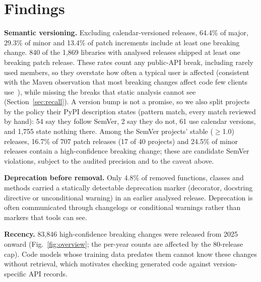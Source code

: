 \documentclass[10pt,twocolumn,letterpaper]{article}
\begin{document}
\section{Findings}\label{sec:findings}

\textbf{Semantic versioning.} Excluding calendar-versioned releases, 64.4\% of major, 29.3\% of minor and 13.4\% of patch increments include at least one
breaking change. 840 of the 1,869 libraries with analysed releases shipped at least one
breaking patch release. These rates count any public-API break, including rarely used members, so they overstate how often a typical user
is affected (consistent with the Maven observation that most breaking changes affect code few clients
use~\cite{ochoa2022}), while missing the breaks that static analysis cannot see (Section~\ref{sec:recall}). A version bump is not a promise, so we also split projects by the policy their PyPI
description states (pattern match, every match reviewed by hand): 54 say they follow SemVer,
2 say they do not, 61 use calendar versions, and 1,755 state nothing there. Among the
SemVer projects' stable ($\geq$1.0) releases, 16.7\% of 707 patch releases
(17 of 40 projects) and 24.5\% of minor releases contain a high-confidence
breaking change; these are candidate SemVer violations, subject to the audited precision and to the caveat above.

\textbf{Deprecation before removal.} Only 4.8\% of removed functions, classes and methods carried a
statically detectable deprecation marker (decorator, docstring directive or unconditional warning) in an earlier
analysed release. Deprecation is often communicated through changelogs or conditional warnings rather than
markers that tools can see.

\textbf{Recency.} 83,846 high-confidence breaking changes were released from 2025 onward
(Fig.~\ref{fig:overview}; the per-year counts are affected by the 80-release cap). Code models whose training data
predates them cannot know these changes without retrieval, which motivates checking generated code against
version-specific API records.
\end{document}
